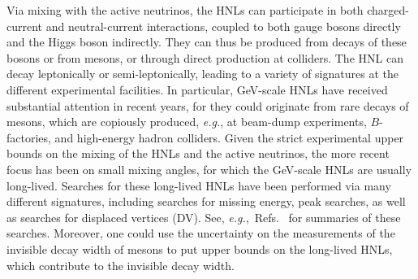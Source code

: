 Via mixing with the active neutrinos, the HNLs can participate in both charged-current and 
neutral-current interactions, coupled to both gauge bosons directly and the Higgs boson indirectly. 
They can thus be produced from decays of these bosons or from mesons, or through direct production 
at colliders. The HNL can decay leptonically or semi-leptonically, leading to a variety of signatures 
at the different experimental facilities. In particular, GeV-scale HNLs have received substantial 
attention in recent years, for they could originate from rare decays of mesons, which are copiously 
produced, \textit{e.g.}, at beam-dump experiments, $B$-factories, and high-energy hadron colliders. Given the 
strict experimental upper bounds on the mixing of the HNLs and the active neutrinos, the more recent 
focus has been on small mixing angles, for which the GeV-scale HNLs are usually long-lived. Searches 
for these long-lived HNLs have been performed via many different signatures, including searches for 
missing energy, peak searches, as well as searches for displaced vertices (DV). See, 
\textit{e.g.},~Refs.~\cite{hnl_limits, Fernandez-Martinez:2023phj} for summaries of these searches. 
Moreover, one could use the uncertainty on the measurements of the invisible decay width of 
mesons to put upper bounds on the long-lived HNLs, which contribute to the invisible decay width.




